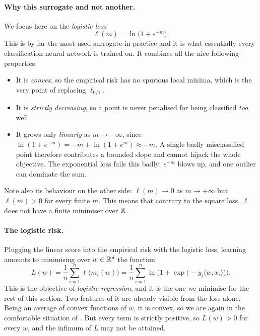 \paragraph{Why this surrogate and not another.}
We focus here on the 
\emph{logistic loss}
\[
\ell(m) = \ln\big( 1 + e^{-m} \big).
\]
This is by far the most used surrogate in practice and it is what essentially every classification
neural network is trained on. It combines all the nice following properties:
\begin{itemize}
    \item It is \emph{convex}, so the empirical risk has no spurious local minima,
    which is the very point of replacing $\ell_{0/1}$.
    \item It is \emph{strictly decreasing}, so a point is never penalised for being
    classified \emph{too} well. 
    \item It grows only \emph{linearly} as $m \to -\infty$, since $\ln(1 + e^{-m}) =
    -m + \ln(1 + e^{m}) \approx -m$. A single badly misclassified point therefore
    contributes a bounded slope and cannot hijack the whole objective. The exponential
    loss fails this badly: $e^{-m}$ blows up, and one outlier can dominate the sum.
\end{itemize}
Note also its behaviour on the other side:
$\ell(m) \to 0$ as $m \to +\infty$ but $\ell(m) > 0$ for every finite $m$. This means that contrary to the square loss, $\ell$ does not have a finite minimiser over $\mathbb{R}$.

\paragraph{The logistic risk.}
Plugging the linear score into the empirical risk with the logistic loss, learning
amounts to minimising over $w \in \mathbb{R}^d$ the function
\[
L(w) = \frac{1}{n} \sum_{i=1}^n \ell\big( m_i(w) \big)
= \frac{1}{n} \sum_{i=1}^n \ln\Big( 1 + \exp\big( - y_i \langle w, x_i \rangle \big) \Big) .
\]
This is the objective of \emph{logistic regression}, and it is the one we minimise for
the rest of this section. Two features of it are already visible from the loss alone.
Being an average of convex functions of $w$, it is convex, so we are again in the
comfortable situation of . But every term is strictly positive,
so $L(w) > 0$ for every $w$, and the infimum of $L$ may not be attained.


